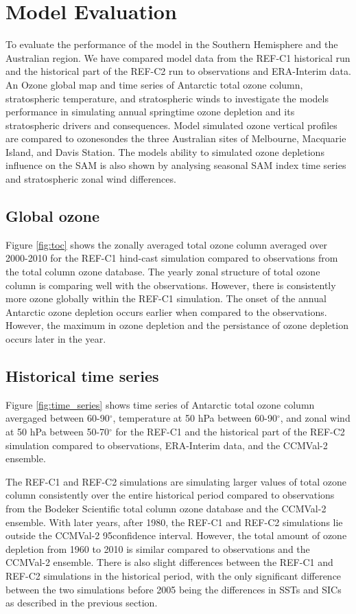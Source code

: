 \section{Model Evaluation}
To evaluate the performance of the model in the Southern Hemisphere and the Australian region. We have compared model data from the REF-C1 historical run and the historical part of the REF-C2 run to observations and ERA-Interim data. An Ozone global map and time series of Antarctic total ozone column, stratospheric temperature, and stratospheric winds to investigate the models performance in simulating annual springtime ozone depletion and its stratospheric drivers and consequences. Model simulated ozone vertical profiles are compared to ozonesondes the three Australian sites of Melbourne, Macquarie Island, and Davis Station. The models ability to simulated ozone depletions influence on the SAM is also shown by analysing seasonal SAM index time series and stratospheric zonal wind differences.

\subsection{Global ozone}
Figure \ref{fig:toc} shows the zonally averaged total ozone column averaged over 2000-2010 for the REF-C1 hind-cast simulation compared to observations from the total column ozone database. The yearly zonal structure of total ozone column is comparing well with the observations. However, there is consistently more ozone globally within the REF-C1 simulation. The onset of the annual Antarctic ozone depletion occurs earlier when compared to the observations. However, the maximum in ozone depletion and the persistance of ozone depletion occurs later in the year.

\subsection{Historical time series}
Figure \ref{fig:time_series} shows time series of Antarctic total ozone column avergaged between 60-90$^{\circ}$, temperature at 50 hPa between 60-90$^{\circ}$, and zonal wind at 50 hPa between 50-70$^{\circ}$ for the REF-C1 and the historical part of the REF-C2 simulation compared to observations, ERA-Interim data, and the CCMVal-2 ensemble.

The REF-C1 and REF-C2 simulations are simulating larger values of total ozone column consistently over the entire historical period compared to observations from the Bodeker Scientific total column ozone database and the CCMVal-2 ensemble. With later years, after 1980, the REF-C1 and REF-C2 simulations lie outside the CCMVal-2 95\percent confidence interval. However, the total amount of ozone depletion from 1960 to 2010 is similar compared to observations and the CCMVal-2 ensemble. There is also slight differences between the REF-C1 and REF-C2 simulations in the historical period, with the only significant difference between the two simulations before 2005 being the differences in SSTs and SICs as described in the previous section. 

